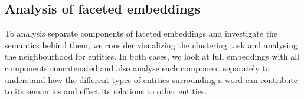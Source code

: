 \subsection{Analysis of faceted embeddings}\label{subsec:exp_faceted}
To analysis separate components of faceted embeddings and investigate the semantics behind them, we consider visualizing the clustering task and analysing the neighbourhood for entities. In both cases, we look at full embeddings with all components concatenated and also analyse each component separately to understand how the different types of entities surrounding a word can contribute to its semantics and effect its relations to other entities.
\begin{figure}[t]
\centering
{}

\end{figure}
